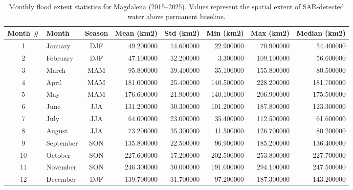 \begin{table}[htbp]
\caption{Monthly flood extent statistics for Magdalena (2015--2025). Values represent the spatial extent of SAR-detected water above permanent baseline.}
\label{tab:seasonal_dynamics}
\begin{tabular}{clcrrrrr}
\toprule
Month \# & Month & Season & Mean (km2) & Std (km2) & Min (km2) & Max (km2) & Median (km2) \\
\midrule
1 & January & DJF & 49.200000 & 14.600000 & 22.900000 & 70.900000 & 54.400000 \\
2 & February & DJF & 47.100000 & 32.200000 & 3.300000 & 109.100000 & 56.600000 \\
3 & March & MAM & 95.800000 & 39.400000 & 35.100000 & 155.800000 & 80.500000 \\
4 & April & MAM & 181.000000 & 25.400000 & 140.500000 & 228.200000 & 181.700000 \\
5 & May & MAM & 176.600000 & 21.900000 & 140.100000 & 206.900000 & 175.500000 \\
6 & June & JJA & 131.200000 & 30.300000 & 101.200000 & 187.800000 & 123.300000 \\
7 & July & JJA & 64.000000 & 23.000000 & 35.400000 & 112.500000 & 61.600000 \\
8 & August & JJA & 73.200000 & 35.300000 & 11.500000 & 126.700000 & 80.200000 \\
9 & September & SON & 135.800000 & 22.500000 & 96.900000 & 185.200000 & 136.400000 \\
10 & October & SON & 227.600000 & 17.200000 & 202.500000 & 253.800000 & 227.700000 \\
11 & November & SON & 246.300000 & 30.000000 & 191.000000 & 294.100000 & 247.500000 \\
12 & December & DJF & 139.700000 & 31.700000 & 97.200000 & 187.300000 & 143.200000 \\
\bottomrule
\end{tabular}
\end{table}

